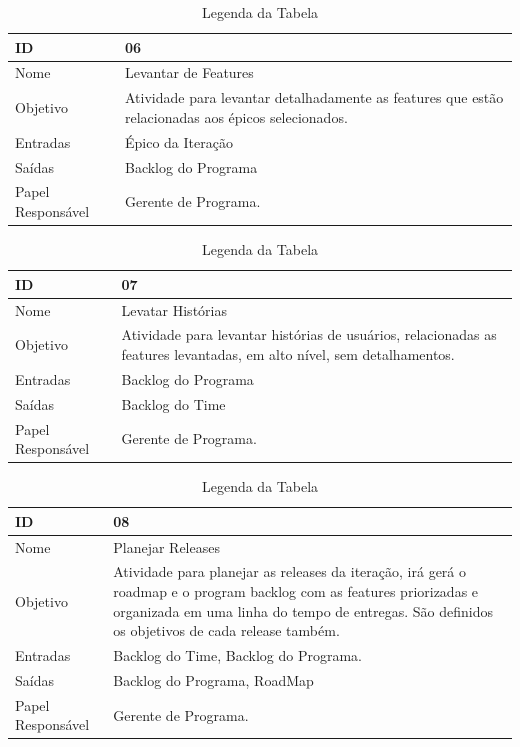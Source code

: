   \begin{table}[H]
    \centering
      \begin{tabular}{| m{5em} | m{10cm} |}
        \hline
        ID       & 06   \\ \hline
        Nome     & Levantar de Features   \\ \hline
        Objetivo & Atividade para levantar detalhadamente as features que estão relacionadas aos épicos selecionados. \\ \hline
        Entradas & Épico da Iteração\\ \hline
        Saídas   & Backlog do Programa \\ \hline
        Papel Responsável   & Gerente de Programa. \\ \hline
      \end{tabular}
      \caption{Legenda da Tabela}
      \label{tabela:atividade6}
  \end{table}

  \begin{table}[H]
    \centering
      \begin{tabular}{| m{5em} | m{10cm} |}
        \hline
        ID       & 07   \\ \hline
        Nome     & Levatar Histórias  \\ \hline
        Objetivo & Atividade para levantar histórias de usuários, relacionadas as features levantadas, em alto nível, sem detalhamentos.  \\ \hline
        Entradas & Backlog do Programa\\ \hline
        Saídas   & Backlog do Time \\ \hline
        Papel Responsável   & Gerente de Programa. \\ \hline
      \end{tabular}
      \caption{Legenda da Tabela}
      \label{tabela:atividade7}
  \end{table}

  \begin{table}[H]
    \centering
      \begin{tabular}{| m{5em} | m{10cm} |}
        \hline
        ID       & 08   \\ \hline
        Nome     & Planejar Releases  \\ \hline
        Objetivo & Atividade para planejar as releases da iteração, irá gerá o roadmap e o program backlog com as features priorizadas e organizada em uma linha do tempo de entregas. São definidos os objetivos de cada release também. \\ \hline
        Entradas & Backlog do Time, Backlog do Programa. \\ \hline
        Saídas   & Backlog do Programa, RoadMap \\ \hline
        Papel Responsável   & Gerente de Programa. \\ \hline
      \end{tabular}
      \caption{Legenda da Tabela}
      \label{tabela:atividade8}
  \end{table}

